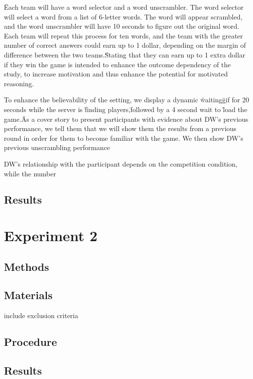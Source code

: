 \documentclass{article} \usepackage{apacite} \usepackage{graphicx} \usepackage{listings}
\begin{document}
\"Each team will have a word selector and a word unscrambler. The word selector will select a word from a list of 6-letter words. The word will appear scrambled, and the word unscrambler will have 10 seconds to figure out the original word. Each team will repeat this process for ten words, and the team with the greater number of correct answers could earn up to 1 dollar, depending on the margin of difference between the two teams.\"

Stating that they can earn up to 1 extra dollar if they win the game is intended to enhance the outcome dependency of the study, to increase motivation and thus enhance the potential for motivated reasoning. 

To enhance the believability of the setting, we display a dynamic \"waiting\" gif for 20 seconds while the server is \"finding players,\" followed by a 4 second wait to \"load the game.\"
 As a cover story to present participants with evidence about DW's previous performance, we tell them that we will show them the results from a previous round in order for them to become familiar with the game. We then show DW's previous unscrambling performance 


DW's relationship with the participant depends on the competition condition, while the number 

\subsection{Results}




\section{Experiment 2}

\subsection{Methods}

\subsection{Materials}

include exclusion criteria

\subsection{Procedure}

\subsection{Results}
\end{document}

